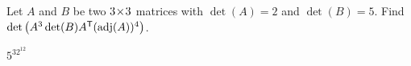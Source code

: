 
\begin{Exercise}[
name={},
title={}, 
difficulty=0,
origin={\cite{AG}}]
Let $A$ and $B$ be two $3 \! \times \! 3$ matrices with $\det(A)=2$ and $\det(B)=5$. Find $\det\left(A^3\det(B){{A}^{\mathsf{T}}}(\text{adj}(A))^4\right)$.
\end{Exercise}

\begin{Answer}
$5^32^{12}$
\end{Answer}
